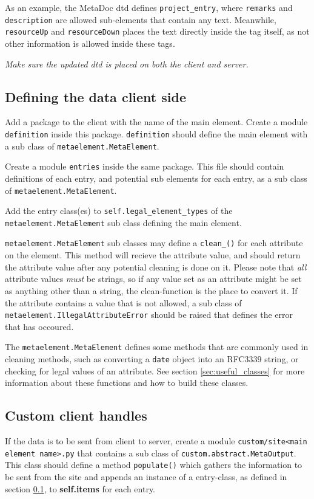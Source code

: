 As an example, the MetaDoc \gls{dtd} \cite{metadoc_dtd} defines
\texttt{project\_entry}, where \texttt{remarks} and \texttt{description} are
allowed sub-elements that contain any text. Meanwhile, \texttt{resourceUp} and
\texttt{resourceDown} places the text directly inside the tag itself, as not
other information is allowed inside these tags.

\textit{Make sure the updated \gls{dtd} is placed on both the client and
server.}

\subsection{Defining the data client side}
\label{sec:defclientmodel}
Add a package \cite{python_modules} to the client with the name of the main
element. Create a module \texttt{definition} inside this package.
\texttt{definition} should define the main element with a sub class of
\texttt{metaelement.MetaElement}.

Create a module \texttt{entries} inside the same package. This file should
contain definitions of each entry, and potential sub elements for each entry,
as a sub class of \texttt{metaelement.MetaElement}. 

Add the entry class(es) to \texttt{self.legal\_element\_types} of the \\ 
\texttt{metaelement.MetaElement} sub class defining the main element. 

\texttt{metaelement.MetaElement} sub classes may define a
\texttt{clean\_<attribute name>()} for each attribute on the element. This
method will recieve the attribute value, and should return the attribute value
after any potential cleaning is done on it. Please note that \textit{all}
attribute values \textit{must} be strings, so if any value set as an attribute
might be set as anything other than a string, the clean-function is the place
to convert it. If the attribute contains a value that is not allowed, a sub
class of \texttt{metaelement.IllegalAttributeError} should be raised that
defines the error that has occoured. 

The \texttt{metaelement.MetaElement} defines some methods that are commonly
used in cleaning methods, such as converting a \texttt{date} object into an
RFC3339 string, or checking for legal values of an attribute. See section
\ref{sec:useful_classes} for more information about these functions and how to
build these classes.

\subsection{Custom client handles}
If the data is to be sent from client to server, create a module
\texttt{custom/site<main element name>.py} that contains a sub class of
\texttt{custom.abstract.MetaOutput}. This class should define a method
\texttt{populate()} which gathers the information to be sent from the site and
appends an instance of a entry-class, as defined in section
\ref{sec:defclientmodel}, to \textbf{self.items} for each entry.


